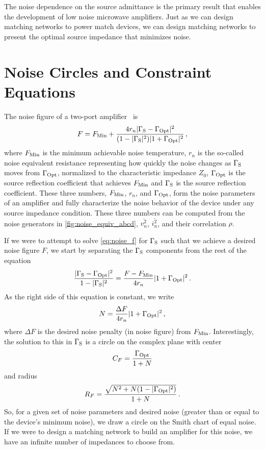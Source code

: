 The noise dependence on the source admittance is the primary result that enables the development of low noise microwave amplifiers.
Just as we can design matching networks to power match devices, we can design matching networks to present the optimal source impedance that minimizes noise.

\section{Noise Circles and Constraint Equations}

The noise figure of a two-port amplifier~\cite{gonzalezMicrowaveTransistorAmplifiers1997} is
%
\begin{equation}
    F = F_{\text{Min}} + \frac{4r_n|\Gamma_{\text{S}} - \Gamma_{\text{Opt}}|^2}{(1-|\Gamma_{\text{S}}|^2)|1+\Gamma_{\text{Opt}}|^2}\,,
    \label{eq:noise_f}
\end{equation}
%
where $F_{\text{Min}}$ is the minimum achievable noise temperature, $r_n$ is the so-called noise equivalent resistance representing how quickly the noise changes as $\Gamma_{\text{S}}$ moves from $\Gamma_{\text{Opt}}$, normalized to the characteristic impedance $Z_0$, $\Gamma_{\text{Opt}}$ is the source reflection coefficient that achieves $F_{\text{Min}}$ and $\Gamma_{\text{S}}$ is the source reflection coefficient.
These three numbers, $F_{\text{Min}}$, $r_n$, and $\Gamma_{\text{Opt}}$, form the noise parameters of an amplifier and fully characterize the noise behavior of the device under any source impedance condition.
These three numbers can be computed from the noise generators in \autoref{fig:noise_equiv_abcd}, $\overline{v_n^2}$, $\overline{i_n^2}$, and their correlation $\rho$.

If we were to attempt to solve \autoref{eq:noise_f} for $\Gamma_{\text{S}}$ such that we achieve a desired noise figure $F$, we start by separating the $\Gamma_{\text{S}}$ components from the rest of the equation
%
\begin{equation}
    \frac{|\Gamma_{\text{S}}-\Gamma_{\text{Opt}}|^2}{1 - |\Gamma_{\text{S}}|^2} = \frac{F - F_{\text{Min}}}{4r_n}|1 + \Gamma_{\text{Opt}}|^2\,.
\end{equation}
%
As the right side of this equation is constant, we write
%
\begin{equation}
    N = \frac{\Delta F}{4r_n}|1 + \Gamma_{\text{Opt}}|^2\,,
    \label{eq:noise_N}
\end{equation}
%
where $\Delta F$ is the desired noise penalty (in noise figure) from $F_{\text{Min}}$.
Interestingly, the solution to this in $\Gamma_{\text{S}}$ is a circle on the complex plane with center
%
\begin{equation}
    C_F = \frac{\Gamma_{\text{Opt}}}{1 + N} 
\end{equation}
%
and radius
\begin{equation}
    R_F = \frac{\sqrt{N^2+N(1-|\Gamma_{\text{Opt}}|^2)}}{1 + N}\,.
\end{equation}
%
So, for a given set of noise parameters and desired noise (greater than or equal to the device's minimum noise), we draw a circle on the Smith chart of equal noise.
If we were to design a matching network to build an amplifier for this noise, we have an infinite number of impedances to choose from.

